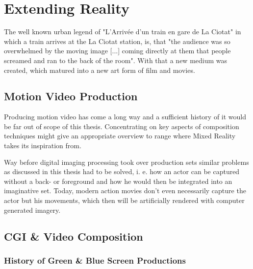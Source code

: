 %
\chapter{Extending Reality}
\label{sec:extendingreality}


The well known urban legend of "L'Arriv\'ee d'un train en gare de La Ciotat" in 
which a train arrives at the La Ciotat station, is, that "the audience was so 
overwhelmed by the moving image [...] coming directly at them that people 
screamed and ran to the back of the room". \cite{wiki:train:2017} With that a 
new medium was created, which matured into a new art form of film and movies.

\section{Motion Video Production}

Producing motion video has come a long way and a sufficient history of it would 
be far out of scope of this thesis. Concentrating on key aspects of composition 
techniques might give an appropriate overview to range where Mixed Reality 
takes its inspiration from.

Way before digital imaging processing took over production sets similar 
problems as discussed in this thesis had to be solved, i. e. how an actor can 
be captured without a back- or foreground and how he would then be integrated 
into an imaginative set. Today, modern action movies don't even necessarily 
capture the actor but his movements, which then will be artificially rendered 
with computer generated imagery.

\section{CGI \& Video Composition}

\subsection{History of Green \& Blue Screen Productions}

